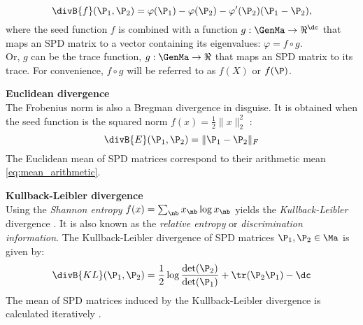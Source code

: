 \iflatexml\else {} \fi
\begin{equation}
\divB{f}(\P_1,\P_2) = \varphi(\P_1) - \varphi(\P_2) - \varphi'(\P_2)(\P_1 - \P_2),
\end{equation}
where the seed function $f$ is combined with a function $g: \GenMa \rightarrow \Re^\dc$ that maps an SPD matrix to a vector containing its eigenvalues: $\varphi = f \circ g$.\\
Or, $g$ can be the trace function, $g: \GenMa \rightarrow \Re$ that maps an SPD matrix to its trace.
For convenience, $f \circ g$ will be referred to as $f(X)$ or $f(\P)$. 

\iflatexml\else {} \fi

\textbf{Euclidean divergence} \\
The Frobenius norm is also a Bregman divergence in disguise. 
It is obtained when the seed function  is the squared norm $f(x) = \frac{1}{2} \lVert x \rVert_2^2$ \cite{dhillon_matrix_2007}:
\begin{equation}
\divB{E}(\P_1, \P_2) = \lVert \P_1-\P_2 \rVert _F
\label{eq:div-eucl}
\end{equation}
The Euclidean mean of SPD matrices correspond to their arithmetic mean \eqref{eq:mean_arithmetic}.

\textbf{Kullback-Leibler divergence} \\
Using the \emph{Shannon entropy} $f(x) = \sum_\nb x_\nb \log x_\nb$ yields the \emph{Kullback-Leibler} divergence \cite{nielsen_sided_2009}.
It is also known as the \emph{relative entropy} or \emph{discrimination information}. The Kullback-Leibler divergence of SPD matrices $\P_1, \P_2 \in \Ma$ is given by:
\begin{equation}
\divB{KL}(\P_1, \P_2) = \frac{1}{2} \log \frac{\det(\P_2)}{\det(\P_1)} + \tr(\P_2 \P_1) - \dc
\label{eq:div-kl}
\end{equation}
The mean of SPD matrices induced by the Kullback-Leibler divergence is calculated iteratively \cite{chebbi_means_2012}. 

